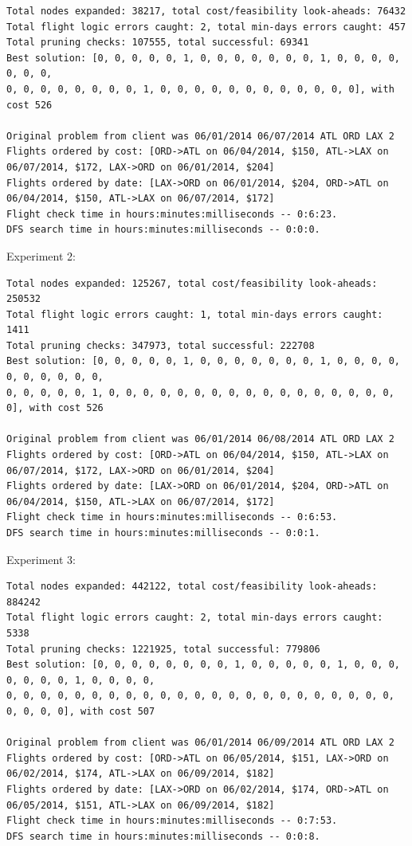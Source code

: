 \documentclass{article}
\begin{document}
\scriptsize
\begin{verbatim}
Total nodes expanded: 38217, total cost/feasibility look-aheads: 76432
Total flight logic errors caught: 2, total min-days errors caught: 457
Total pruning checks: 107555, total successful: 69341
Best solution: [0, 0, 0, 0, 0, 1, 0, 0, 0, 0, 0, 0, 0, 1, 0, 0, 0, 0, 0, 0, 0,
0, 0, 0, 0, 0, 0, 0, 0, 1, 0, 0, 0, 0, 0, 0, 0, 0, 0, 0, 0, 0], with cost 526

Original problem from client was 06/01/2014 06/07/2014 ATL ORD LAX 2
Flights ordered by cost: [ORD->ATL on 06/04/2014, $150, ATL->LAX on 06/07/2014, $172, LAX->ORD on 06/01/2014, $204]
Flights ordered by date: [LAX->ORD on 06/01/2014, $204, ORD->ATL on 06/04/2014, $150, ATL->LAX on 06/07/2014, $172]
Flight check time in hours:minutes:milliseconds -- 0:6:23.
DFS search time in hours:minutes:milliseconds -- 0:0:0.
\end{verbatim}
\normalsize

Experiment 2:

\scriptsize
\begin{verbatim}
Total nodes expanded: 125267, total cost/feasibility look-aheads: 250532
Total flight logic errors caught: 1, total min-days errors caught: 1411
Total pruning checks: 347973, total successful: 222708
Best solution: [0, 0, 0, 0, 0, 1, 0, 0, 0, 0, 0, 0, 0, 1, 0, 0, 0, 0, 0, 0, 0, 0, 0, 0,
0, 0, 0, 0, 0, 1, 0, 0, 0, 0, 0, 0, 0, 0, 0, 0, 0, 0, 0, 0, 0, 0, 0, 0], with cost 526

Original problem from client was 06/01/2014 06/08/2014 ATL ORD LAX 2
Flights ordered by cost: [ORD->ATL on 06/04/2014, $150, ATL->LAX on 06/07/2014, $172, LAX->ORD on 06/01/2014, $204]
Flights ordered by date: [LAX->ORD on 06/01/2014, $204, ORD->ATL on 06/04/2014, $150, ATL->LAX on 06/07/2014, $172]
Flight check time in hours:minutes:milliseconds -- 0:6:53.
DFS search time in hours:minutes:milliseconds -- 0:0:1.
\end{verbatim}
\normalsize

Experiment 3:

\scriptsize
\begin{verbatim}
Total nodes expanded: 442122, total cost/feasibility look-aheads: 884242
Total flight logic errors caught: 2, total min-days errors caught: 5338
Total pruning checks: 1221925, total successful: 779806
Best solution: [0, 0, 0, 0, 0, 0, 0, 0, 1, 0, 0, 0, 0, 0, 1, 0, 0, 0, 0, 0, 0, 0, 1, 0, 0, 0, 0,
0, 0, 0, 0, 0, 0, 0, 0, 0, 0, 0, 0, 0, 0, 0, 0, 0, 0, 0, 0, 0, 0, 0, 0, 0, 0, 0], with cost 507

Original problem from client was 06/01/2014 06/09/2014 ATL ORD LAX 2
Flights ordered by cost: [ORD->ATL on 06/05/2014, $151, LAX->ORD on 06/02/2014, $174, ATL->LAX on 06/09/2014, $182]
Flights ordered by date: [LAX->ORD on 06/02/2014, $174, ORD->ATL on 06/05/2014, $151, ATL->LAX on 06/09/2014, $182]
Flight check time in hours:minutes:milliseconds -- 0:7:53.
DFS search time in hours:minutes:milliseconds -- 0:0:8.
\end{verbatim}
\normalsize
\end{document}
